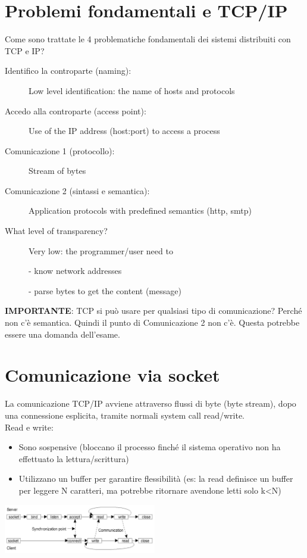 \section{Problemi fondamentali e TCP/IP}
Come sono trattate le 4 problematiche fondamentali dei sistemi distribuiti con TCP e IP?
\begin{description}
    \item[Identifico la controparte (naming):]
    \item[] Low level identification: the name of hosts and protocols
    \item[Accedo alla controparte (access point):]
    \item[] Use of the IP address (host:port) to access a process
    \item[Comunicazione 1 (protocollo):]
    \item[] Stream of bytes
    \item[Comunicazione 2 (sintassi e semantica):]
    \item[] Application protocols with predefined semantics (http, smtp)
    \item[What level of transparency?] Very low: the programmer/user need to
    \item[] - know network addresses
    \item[] - parse bytes to get the content (message)
\end{description}

\textbf{IMPORTANTE}: TCP si può usare per qualsiasi tipo di comunicazione? Perché non c'è semantica. Quindi il punto di Comunicazione 2 non c'è. Questa potrebbe essere una domanda dell'esame.

\section{Comunicazione via socket}
La comunicazione TCP/IP avviene attraverso flussi di byte (byte stream), dopo una connessione esplicita, tramite normali system call read/write.
\\Read e write:
\begin{itemize}
    \item Sono sospensive (bloccano il processo finché il sistema operativo non ha effettuato la lettura/scrittura)
    \item Utilizzano un buffer per garantire flessibilità (es: la read definisce un buffer per leggere N caratteri, ma potrebbe ritornare avendone letti solo k<N)
\end{itemize}
\begin{center}
    \includegraphics[width=0.5\textwidth]{img/socket_comunicazione1.jpg}
\end{center}

